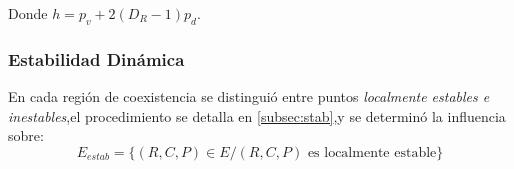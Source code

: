 Donde $ h = p_v + 2(D_R -1) p_d$.

\subsubsection{Estabilidad Din\'amica}
En cada regi\'on de coexistencia se distingui\'o entre puntos \emph{localmente estables e inestables},el procedimiento se detalla en \ref{subsec:stab},y se determin\'o la influencia sobre:
\begin{equation}\label{eq:estabreg}
E_{estab} = \{ (R,C,P) \in E / (R,C,P) \mbox{ es localmente estable} \}
\end{equation}

